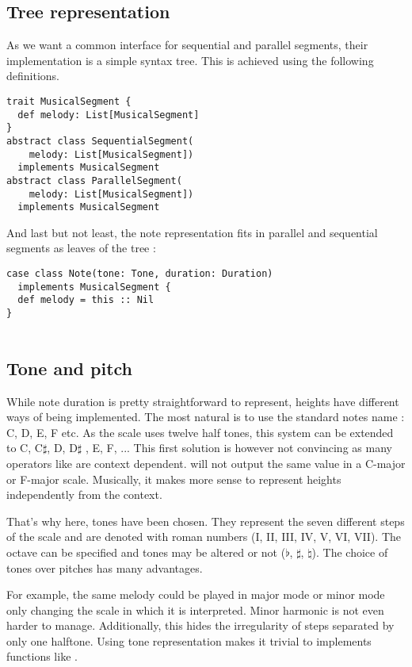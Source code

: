 \documentclass[twocolumn, 11pt]{article}
\begin{document}
\subsection{Tree representation}
As we want a common interface for sequential and parallel segments, their implementation is a simple syntax tree.
This is achieved using the following definitions.
\begin{lstlisting}
trait MusicalSegment {
  def melody: List[MusicalSegment]
}
abstract class SequentialSegment(
    melody: List[MusicalSegment])
  implements MusicalSegment
abstract class ParallelSegment(
    melody: List[MusicalSegment])
  implements MusicalSegment
\end{lstlisting}
And last but not least, the note representation fits in parallel and sequential segments as leaves of the tree :

\begin{lstlisting}
case class Note(tone: Tone, duration: Duration)
  implements MusicalSegment {
  def melody = this :: Nil
}


\end{lstlisting}

\subsection{Tone and pitch}

While note duration is pretty straightforward to represent, heights have different ways of being implemented.
The most natural is to use the standard notes name : C, D, E, F etc. As the scale uses twelve half tones, this system can be extended to C, C$\sharp$, D, D$\sharp$ , E, F, ... This first solution is however not convincing as many operators like  are context dependent.  will not output the same value in a C-major or F-major scale. Musically, it makes more sense to represent heights independently from the context.

That's why here, tones have been chosen. They represent the seven different steps of the scale and are denoted with roman numbers (I, II, III, IV, V, VI, VII). The octave can be specified and tones may be altered or not ($\flat$, $\sharp$, $\natural$).
The choice of tones over pitches has many advantages.

For example, the same melody could be played in major mode or minor mode only changing the scale in which it is interpreted. Minor harmonic is not even harder to manage. Additionally, this hides the irregularity of steps separated by only one halftone. Using tone representation makes it trivial to implements functions like .
\end{document}
